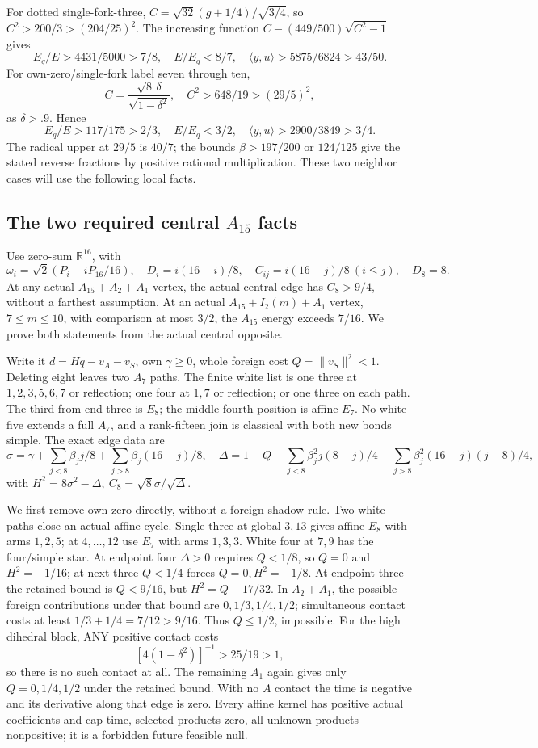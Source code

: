 \documentclass[11pt]{article}
\theoremstyle{definition}
\theoremstyle{remark}
\newcommand{\ip}[2]{\langle #1,#2\rangle}
\newcommand{\norm}[1]{\lVert #1\rVert}
\begin{document}
For dotted single-fork-three,
\(C=\sqrt{32}(g+1/4)/\sqrt{3/4}\), so
\(C^2>200/3>(204/25)^2\).
The increasing function \(C-(449/500)\sqrt{C^2-1}\) gives
\[
 E_q/E>4431/5000>7/8,\quad E/E_q<8/7,\quad
 \ip yu>5875/6824>43/50 .
\]
For own-zero/single-fork label seven through ten,
\[
 C=\frac{\sqrt8\,\delta}{\sqrt{1-\delta^2}},\quad
 C^2>648/19>(29/5)^2 ,
\]
as \(\delta>.9\). Hence
\[
 E_q/E>117/175>2/3,\quad E/E_q<3/2,\quad
 \ip yu>2900/3849>3/4 .
\]
The radical upper at \(29/5\) is \(40/7\);
the bounds \(\beta>197/200\) or \(124/125\) give the stated
reverse fractions by positive rational multiplication.
These two neighbor cases will use the following local facts.

\subsection[The two required central A15 facts]{The two required central \(A_{15}\) facts}
\label{app:D18localA15}
Use zero-sum \(\mathbb R^{16}\), with
\[
 \omega_i=\sqrt2(P_i-iP_{16}/16),\quad
 D_i=i(16-i)/8,\quad C_{ij}=i(16-j)/8\ (i\leq j),\quad D_8=8 .
\]
At any actual \(A_{15}+A_2+A_1\) vertex, the actual central
edge has \(C_8>9/4\), without a farthest assumption.
At an actual \(A_{15}+I_2(m)+A_1\) vertex, \(7\leq m\leq10\),
with comparison at most \(3/2\), the \(A_{15}\) energy exceeds
\(7/16\). We prove both statements from the actual central opposite.

Write it \(d=Hq-v_A-v_S\), own \(\gamma\geq0\),
whole foreign cost \(Q=\norm{v_S}^2<1\).
Deleting eight leaves two \(A_7\) paths.
The finite white list is one three at
\(1,2,3,5,6,7\) or reflection; one four at \(1,7\)
or reflection; or one three on each path.
The third-from-end three is \(E_8\); the middle fourth position
is affine \(E_7\). No white five extends a full \(A_7\), and
a rank-fifteen join is classical with both new bonds simple.
The exact edge data are
\[
 \sigma=\gamma+
 \sum_{j<8}\beta_jj/8+\sum_{j>8}\beta_j(16-j)/8,\quad
 \Delta=1-Q-\sum_{j<8}\beta_j^2j(8-j)/4
             -\sum_{j>8}\beta_j^2(16-j)(j-8)/4 ,
\]
with \(H^2=8\sigma^2-\Delta,\ C_8=\sqrt8\sigma/\sqrt\Delta\).

We first remove own zero directly, without a foreign-shadow rule.
Two white paths close an actual affine cycle.
Single three at global \(3,13\) gives affine \(E_8\)
with arms \(1,2,5\); at \(4,\ldots,12\) use \(E_7\)
with arms \(1,3,3\).
White four at \(7,9\) has the four/simple star.
At endpoint four \(\Delta>0\) requires \(Q<1/8\),
so \(Q=0\) and \(H^2=-1/16\);
at next-three \(Q<1/4\) forces \(Q=0,H^2=-1/8\).
At endpoint three the retained bound is \(Q<9/16\),
but \(H^2=Q-17/32\).
In \(A_2+A_1\), the possible foreign contributions under that
bound are \(0,1/3,1/4,1/2\); simultaneous contact costs
at least \(1/3+1/4=7/12>9/16\).
Thus \(Q\leq1/2\), impossible.
For the high dihedral block, ANY positive contact costs
\[
 [4(1-\delta^2)]^{-1}>25/19>1 ,
\]
so there is no such contact at all. The remaining \(A_1\)
again gives only \(Q=0,1/4,1/2\) under the retained bound.
With no \(A\) contact the time is negative and its derivative
along that edge is zero.
Every affine kernel has positive actual coefficients and cap time,
selected products zero, all unknown products nonpositive;
it is a forbidden future feasible null.
\end{document}
